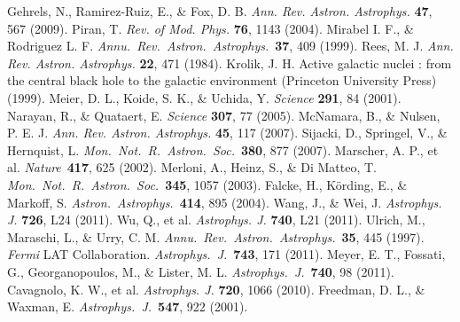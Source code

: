 \documentclass[12pt]{article}
\def\aap{{\it Astron.~Astrophys.}~}
\def\apj{{\it Astrophys.~J.}~}
\def\araa{{\it Annu.~Rev.~Astron.~Astrophys.}~}
\def\mnras{{\it Mon.~Not.~R.~Astron.~Soc.}~}
\def\nat{{\it Nature}~}
\begin{document}
\begin{thebibliography}{99}
 Gehrels, N., Ramirez-Ruiz, E., \& Fox, D. B. \emph{Ann. Rev. Astron. Astrophys.} \textbf{47}, 567 (2009).	
 Piran, T.  \emph{Rev. of Mod. Phys.} \textbf{76}, 1143 (2004).	
 Mirabel I. F., \& Rodriguez L. F. \araa 	\textbf{37}, 409 (1999).	
 Rees, M. J. \emph{Ann. Rev. Astron. Astrophys.} \textbf{22}, 471	(1984).	
 Krolik, J. H. Active galactic nuclei : from the central black hole to the galactic
environment (Princeton University Press) (1999).	
 Meier, D. L., Koide, S. K., \& Uchida, Y.  \emph{Science} \textbf{291}, 84 (2001).	
 Narayan, R., \& Quataert, E. \emph{Science} \textbf{307}, 77 (2005).	
 McNamara, B., \& Nulsen, P. E. J. \emph{Ann. Rev. Astron. Astrophys.} \textbf{45}, 117 (2007).		
 Sijacki, D., Springel, V., \& Hernquist, L. \mnras \textbf{380}, 877 (2007).		
 Marscher, A. P., et al.  \nat \textbf{417}, 625 (2002).	
 Merloni, A., Heinz, S., \& Di Matteo, T.  \mnras \textbf{345}, 1057 (2003).	
 Falcke, H., K\"ording, E., \& Markoff, S. \aap 	\textbf{414}, 895 (2004).	
 Wang, J., \& Wei, J. \emph{Astrophys. J.} \textbf{726}, L24 (2011).		
 Wu, Q., et al. \emph{Astrophys. J.} \textbf{740}, L21 (2011).		
 Ulrich, M., Maraschi, L., \& Urry, C. M. \araa \textbf{35}, 445 (1997). 
%
 \emph{Fermi} LAT Collaboration. \apj \textbf{743}, 171 (2011).		
 Meyer, E. T., Fossati, G., Georganopoulos, M., \& Lister, M. L. \apj \textbf{740}, 98 (2011).		
 Cavagnolo, K. W., et al. \emph{Astrophys. J.} \textbf{720}, 1066 (2010).	
 Freedman, D. L., \& Waxman, E. \apj \textbf{547}, 922 (2001).	

\end{thebibliography}
\end{document}

